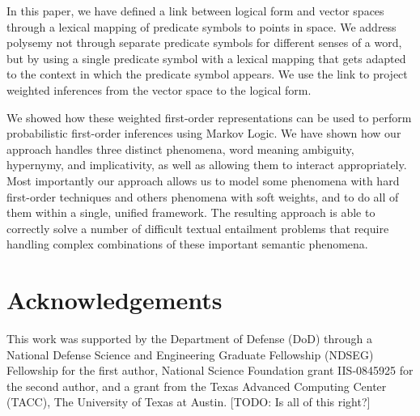 In this paper, we have defined a link between logical form and vector
spaces through a lexical mapping of predicate symbols to points in
space. We address polysemy not through separate predicate symbols for
different senses of a word, but by using a single predicate symbol
with a lexical mapping that gets
adapted to the context in which the predicate symbol appears. We use
the link to project weighted inferences from the vector space to the
logical form. 

We showed how these weighted first-order
representations can be used to perform probabilistic first-order inferences
using Markov Logic.  We have shown how our approach handles three distinct
phenomena, word meaning ambiguity, hypernymy, and implicativity, as well as
allowing them to interact appropriately.  Most importantly our approach allows 
us to model some phenomena with hard first-order techniques and
others phenomena with soft weights, and to do all of them within a
single, unified framework.
The resulting approach is able to correctly solve a number of difficult
textual entailment problems that require handling complex combinations of these
important semantic phenomena.




\section*{Acknowledgements}

This work was supported by the Department of Defense (DoD) through a
National Defense Science and Engineering Graduate Fellowship (NDSEG) Fellowship
for the first author, National Science Foundation grant IIS-0845925 for the
second author, and a grant from the Texas Advanced
Computing Center (TACC), The University of Texas at Austin. 
[TODO: Is all of this right?]
